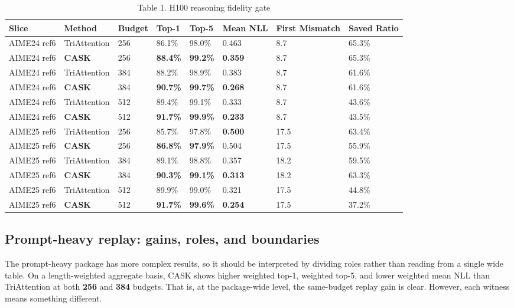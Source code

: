 \begin{table}[H]
\centering
\small
\caption{Table 1. H100 reasoning fidelity gate}
\begin{tabularx}{\textwidth}{YYYYYYYY}
\toprule
Slice & Method & Budget & Top-1 & Top-5 & Mean NLL & First Mismatch & Saved Ratio \\
\midrule
AIME24 ref6 & TriAttention & 256 & 86.1\% & 98.0\% & 0.463 & 8.7 & 65.3\% \\
AIME24 ref6 & \textbf{CASK} & 256 & \textbf{88.4\%} & \textbf{99.2\%} & \textbf{0.359} & 8.7 & 65.3\% \\
AIME24 ref6 & TriAttention & 384 & 88.2\% & 98.9\% & 0.383 & 8.7 & 61.6\% \\
AIME24 ref6 & \textbf{CASK} & 384 & \textbf{90.7\%} & \textbf{99.7\%} & \textbf{0.268} & 8.7 & 61.6\% \\
AIME24 ref6 & TriAttention & 512 & 89.4\% & 99.1\% & 0.333 & 8.7 & 43.6\% \\
AIME24 ref6 & \textbf{CASK} & 512 & \textbf{91.7\%} & \textbf{99.9\%} & \textbf{0.233} & 8.7 & 43.5\% \\
AIME25 ref6 & TriAttention & 256 & 85.7\% & 97.8\% & \textbf{0.500} & 17.5 & 63.4\% \\
AIME25 ref6 & \textbf{CASK} & 256 & \textbf{86.8\%} & \textbf{97.9\%} & 0.504 & 17.5 & 55.9\% \\
AIME25 ref6 & TriAttention & 384 & 89.1\% & 98.8\% & 0.357 & 18.2 & 59.5\% \\
AIME25 ref6 & \textbf{CASK} & 384 & \textbf{90.3\%} & \textbf{99.1\%} & \textbf{0.313} & 18.2 & 63.3\% \\
AIME25 ref6 & TriAttention & 512 & 89.9\% & 99.0\% & 0.321 & 17.5 & 44.8\% \\
AIME25 ref6 & \textbf{CASK} & 512 & \textbf{91.7\%} & \textbf{99.6\%} & \textbf{0.254} & 17.5 & 37.2\% \\
\bottomrule
\end{tabularx}
\end{table}


\subsection{Prompt-heavy replay: gains, roles, and boundaries}


The prompt-heavy package has more complex results, so it should be interpreted by dividing roles rather than reading from a single wide table. On a length-weighted aggregate basis, CASK shows higher weighted top-1, weighted top-5, and lower weighted mean NLL than TriAttention at both \textbf{256} and \textbf{384} budgets. That is, at the package-wide level, the same-budget replay gain is clear. However, each witness means something different.

